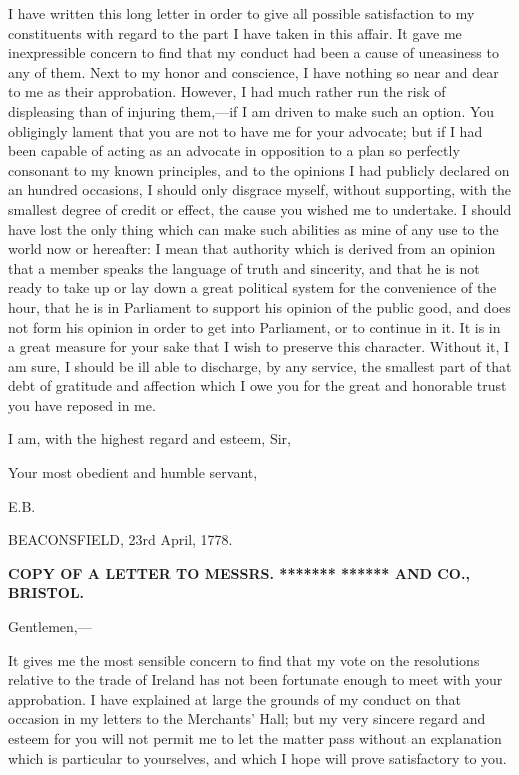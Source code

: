 I have written this long letter in order to give all possible satisfaction to my constituents with regard to the part I have taken in this affair. It gave me inexpressible concern to find that my conduct had been a cause of uneasiness to any of them. Next to my honor and conscience, I have nothing so near and dear to me as their approbation. However, I had much rather run the risk of displeasing than of injuring them,—if I am driven to make such an option. You obligingly lament that you are not to have me for your advocate; but if I had been capable of acting as an advocate in opposition to a plan so perfectly consonant to my known principles, and to the opinions I had publicly declared on an hundred occasions, I should only disgrace myself, without supporting, with the smallest degree of credit or effect, the cause you wished me to undertake. I should have lost the only thing which can make such abilities as mine of any use to the world now or hereafter: I mean that authority which is derived from an opinion that a member speaks the language of truth and sincerity, and that he is not ready to take up or lay down a great political system for the convenience of the hour, that he is in Parliament to support his opinion of the public good, and does not form his opinion in order to get into Parliament, or to continue in it. It is in a great measure for your sake that I wish to preserve this character. Without it, I am sure, I should be ill able to discharge, by any service, the smallest part of that debt of gratitude and affection which I owe you for the great and honorable trust you have reposed in me.

I am, with the highest regard and esteem, Sir,

\hspace{1.5in} Your most obedient and humble servant,

\hfill E.B.

BEACONSFIELD, 23rd April, 1778.

\begin{center}
  \textbf{\large 
    COPY OF A LETTER TO MESSRS. ******* ****** AND CO., BRISTOL.
  } \par 
\end{center}

Gentlemen,—

It gives me the most sensible concern to find that my vote on the resolutions relative to the trade of Ireland has not been fortunate enough to meet with your approbation. I have explained at large the grounds of my conduct on that occasion in my letters to the Merchants' Hall; but my very sincere regard and esteem for you will not permit me to let the matter pass without an explanation which is particular to yourselves, and which I hope will prove satisfactory to you.

